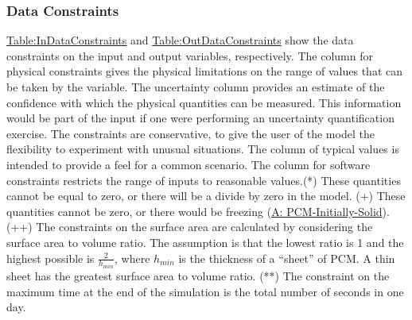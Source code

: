 \documentclass[12pt]{article}
\begin{document}
\subsubsection{Data Constraints}
\label{Sec:DataConstraints}
\hyperref[Table:InDataConstraints]{Table:InDataConstraints} and \hyperref[Table:OutDataConstraints]{Table:OutDataConstraints} show the data constraints on the input and output variables, respectively. The column for physical constraints gives the physical limitations on the range of values that can be taken by the variable. The uncertainty column provides an estimate of the confidence with which the physical quantities can be measured. This information would be part of the input if one were performing an uncertainty quantification exercise. The constraints are conservative, to give the user of the model the flexibility to experiment with unusual situations. The column of typical values is intended to provide a feel for a common scenario. The column for software constraints restricts the range of inputs to reasonable values.(*) These quantities cannot be equal to zero, or there will be a divide by zero in the model. (+) These quantities cannot be zero, or there would be freezing (\hyperref[A:PCM-Initially-Solid]{A: PCM-Initially-Solid}). (++) The constraints on the surface area are calculated by considering the surface area to volume ratio. The assumption is that the lowest ratio is 1 and the highest possible is $\frac{2}{{h_{min}}}$, where ${h_{min}}$ is the thickness of a ``sheet'' of PCM. A thin sheet has the greatest surface area to volume ratio. (**) The constraint on the maximum time at the end of the simulation is the total number of seconds in one day.
\end{document}

